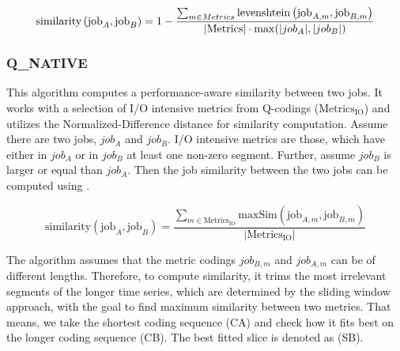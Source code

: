 \documentclass{jhps}
\begin{document}
\begin{equation}
	\text{similarity}\left(\text{job}_{A},\text{job}_{B} \right) = 1 - \frac{ \sum_{m \in Metrics}^{} \text{levenshtein} \left(\text{job}_{A,m},\text{\text{job}}_{B,m} \right) }{|\text{Metrics}| \cdot \max(|job_A|, |job_{B}|)}
\end{equation}

\FloatBarrier
\subsubsection{Q\_NATIVE}
This algorithm computes a performance-aware similarity between two jobs.
It works with a selection of I/O intensive metrics from Q-codings ($\text{Metrics}_{\text{IO}}$) and utilizes the Normalized-Difference distance for similarity computation.
Assume there are two jobs, $job_A$ and $job_B$.
I/O intensive metrics are those, which have either in $job_A$ or in $job_B$ at least one non-zero segment.
Further, assume $job_B$ is larger or equal than $job_A$.
Then the job similarity between the two jobs can be computed using .

\begin{equation}
  \text{similarity}\left(\text{job}_{A},\text{job}_{B} \right) = \frac{ \sum_{m \in \text{Metrics}_{\text{IO}}}^{} {\text{maxSim} \left( \text{job}_{A,m}, \text{job}_{B,m} \right)}}{|\text{Metrics}_{\text{IO}}|}
  \label{eq:hexn}
\end{equation}

The algorithm assumes that the metric codings $job_{B,m}$ and $job_{A,m}$ can be of different lengths.
Therefore, to compute similarity, it trims the most irrelevant segments of the longer time series, which are determined by the sliding window approach, with the goal to find maximum similarity between two metrics.
That means, we take the shortest coding sequence (CA) and check how it fits best on the longer coding sequence (CB).
The best fitted slice is denoted as (SB).
\end{document}
